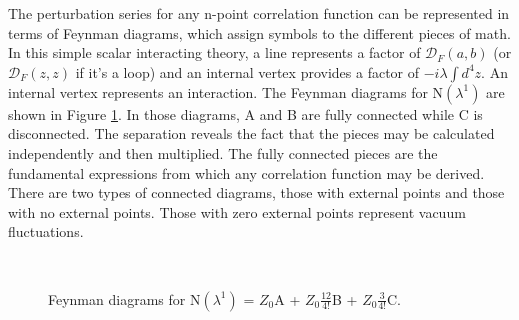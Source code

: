 \documentclass[12pt]{article}
\begin{document}
The perturbation series for any n-point correlation function can be represented in terms of Feynman diagrams, which assign symbols to the different pieces of math. In this simple scalar interacting theory, a line represents a factor of $\mathcal{D}_F(a,b)$ (or $\mathcal{D}_F(z,z)$ if it's a loop) and an internal vertex provides a factor of $-i\lambda\int d^4z$. An internal vertex represents an interaction. The Feynman diagrams for N$(\lambda^1)$ are shown in Figure \ref{fig:feynfullprop}. In those diagrams, A and B are fully connected while C is disconnected. The separation reveals the fact that the pieces may be calculated independently and then multiplied. The fully connected pieces are the fundamental expressions from which any correlation function may be derived. There are two types of connected diagrams, those with external points and those with no external points. Those with zero external points represent vacuum fluctuations.
\begin{figure}[htbp]
     \centering
   \mbox{
       \qquad
       \qquad
       \qquad
     }
    \caption[Feynman diagrams for the Numerator N$(\lambda^1)$ = $Z_0$A + $Z_0$B + $Z_0$C.]
    {Feynman diagrams for N$(\lambda^1)$ = $Z_0$A + $Z_0\frac{12}{4!}$B + $Z_0\frac{3}{4!}$C.}
    \label{fig:feynfullprop}
\end{figure}
\end{document}
